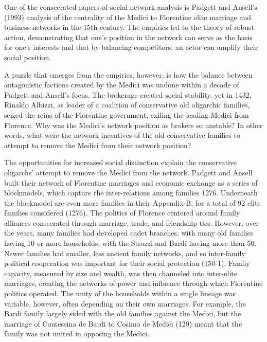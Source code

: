 \documentclass[12pt]{article}
\begin{document}
One of the consecrated papers of social network analysis is Padgett and Ansell’s (1993) analysis of the centrality of the Medici to Florentine elite marriage and business networks in the 15th century. The empirics led to the theory of robust action, demonstrating that one’s position in the network can serve as the basis for one’s interests and that by balancing competitors, an actor can amplify their social position. 

A puzzle that emerges from the empirics, however, is how the balance between antagonistic factions created by the Medici was undone within a decade of Padgett and Ansell’s focus. The brokerage created social stability, yet in 1432, Rinaldo Albizzi, as leader of a coalition of conservative old oligarchic families, seized the reins of the Florentine government, exiling the leading Medici from Florence. Why was the Medici's network position as brokers so unstable? In other words, what were the network incentives of the old conservative families to attempt to remove the Medici from their network position? 

The opportunities for increased social distinction explain the conservative oligarchs' attempt to remove the Medici from the network. Padgett and Ansell built their network of Florentine marriages and economic exchange as a series of blockmodels, which capture the inter-relations among families \citep{padgett1993robust} 1276. Underneath the blockmodel are even more families in their Appendix B, for a total of 92 elite families considered (1276). The politics of Florence centered around family alliances consecrated through marriage, trade, and friendship ties. However, over the years, many families had developed cadet branches, with many old families having 10 or more households, with the Strozzi and Bardi having more than 50. Newer families had smaller, less ancient family networks, and so inter-family political cooperation was important for their social protection (150-1). Family capacity, measured by size and wealth, was then channeled into inter-elite marriages, creating the networks of power and influence through which Florentine politics operated. The unity of the households within a single lineage was variable, however, often depending on their own marriages. For example, the Bardi family largely sided with the old families against the Medici, but the marriage of Contessina de Bardi to Cosimo de Medici (129) meant that the family was not united in opposing the Medici. 
	
\end{document}
